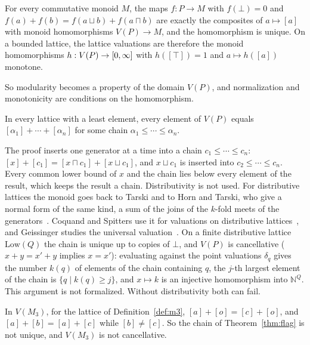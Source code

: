 \begin{theorem}
\label{thm:vmonoid}
For every commutative monoid $M$, the maps $f : P \to M$ with
$f(\bot) = 0$ and $f(a) + f(b) = f(a \sqcup b) + f(a \sqcap b)$ are
exactly the composites of $a \mapsto [a]$ with monoid homomorphisms
$V(P) \to M$, and the homomorphism is unique. On a bounded lattice, the
lattice valuations are therefore the monoid homomorphisms
$h : V(P) \to [0,\infty]$ with $h([\top]) = 1$ and $a \mapsto h([a])$
monotone.
\end{theorem}

\noindent
So modularity becomes a property of the domain $V(P)$, and normalization
and monotonicity are conditions on the homomorphism.

\begin{theorem}
\label{thm:flag}
In every lattice with a least element, every element of $V(P)$ equals
$[\alpha_1] + \cdots + [\alpha_n]$ for some chain
$\alpha_1 \le \cdots \le \alpha_n$.
\end{theorem}

\noindent
The proof inserts one generator at a time into a chain
$c_1 \le \cdots \le c_n$: $[x] + [c_1] = [x \sqcap c_1] + [x \sqcup c_1]$,
and $x \sqcup c_1$ is inserted into $c_2 \le \cdots \le c_n$. Every common
lower bound of $x$ and the chain lies below every element of the result,
which keeps the result a chain. Distributivity is not used. For
distributive lattices the monoid goes back to Tarski and to Horn and
Tarski, who give a normal form of the same kind, a sum of the joins of
the $k$-fold meets of the generators~\cite{tarski1938,horn-tarski1948}.
Coquand and Spitters use it for valuations on distributive
lattices~\cite{coquand-spitters2009}, and Geissinger studies the
universal valuation~\cite{geissinger1973}. On a finite
distributive lattice $\mathrm{Low}(Q)$ the chain is unique up to copies
of $\bot$, and $V(P)$ is cancellative ($x + y = x' + y$ implies
$x = x'$): evaluating against the point
valuations $\delta_q$ gives the number $k(q)$ of elements of the chain
containing $q$, the $j$-th largest element of the chain is
$\{q \mid k(q) \ge j\}$, and $x \mapsto k$ is an injective homomorphism
into $\mathbb{N}^{Q}$. This argument is not formalized. Without
distributivity both can fail.

\begin{proposition}
\label{prop:vmonoid-m3}
In $V(M_3)$, for the lattice of Definition~\ref{def:m3},
$[a] + [o] = [c] + [o]$, and $[a] + [b] = [a] + [c]$ while
$[b] \ne [c]$. So the chain of Theorem~\ref{thm:flag} is not unique, and
$V(M_3)$ is not cancellative.
\end{proposition}

